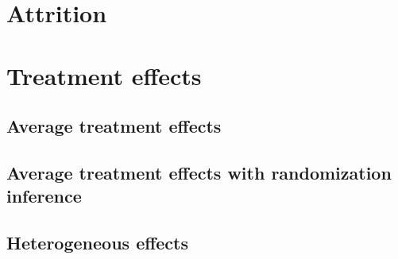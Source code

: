 \documentclass[10pt]{article}
\begin{document}
	\clearpage

\section{Attrition}

	

	
	
	
	
	

	
	
	
	

	\clearpage

\section{Treatment effects}

	\subsection{Average treatment effects}

		
		
		
		
		
		
		
		

	\clearpage

    \subsection{Average treatment effects with randomization inference}

        
        
        
        
        
        
        

    \clearpage

	\subsection{Heterogeneous effects}
\end{document}
